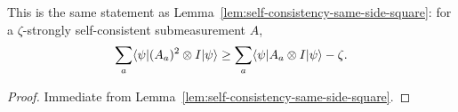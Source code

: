 \begin{theorem}\label{prop:cool-prop}
	\leanok
	This is the same statement as Lemma~\ref{lem:self-consistency-same-side-square}: for a $\zeta$-strongly self-consistent submeasurement $A$,
	\[
		\sum_a \langle \psi \rvert (A_a)^2 \otimes I \lvert \psi \rangle \geq \sum_a \langle \psi \rvert A_a \otimes I \lvert \psi \rangle -\zeta.
	\]
\end{theorem}
\begin{proof}
	\leanok
	Immediate from Lemma~\ref{lem:self-consistency-same-side-square}.
\end{proof}
